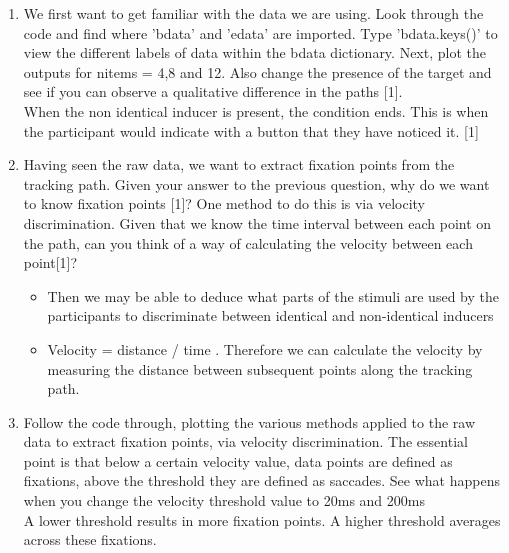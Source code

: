 \documentclass[12pt,english]{scrartcl}
\begin{document}
\begin{enumerate}
\item We first want to get familiar with the data we are using. Look through the code and find where 'bdata' and 'edata' are imported. Type 'bdata.keys()' to view the different labels of data within the bdata dictionary. Next, plot the outputs for nitems = 4,8 and 12. Also change the presence of the target and see if you can observe a qualitative difference in the paths [1]. \\

 \color{blue}
 When the non identical inducer is present, the condition ends. This is when the participant would indicate with a button that they have noticed it. [1] 
 
 \color{black}
 \item Having seen the raw data, we want to extract fixation points from the tracking path. Given your answer to the previous question, why do we want to know fixation points [1]? One method to do this is via velocity discrimination. Given that we know the time interval between each point on the path, can you think of a way of calculating the velocity between each point[1]? \\
 
 \color{blue}
 \begin{itemize}
  \item Then we may be able to deduce what parts of the stimuli are used by the participants to discriminate between identical and non-identical inducers \\
 
  \item Velocity = distance / time . Therefore we can calculate the velocity by measuring the distance between subsequent points along the tracking path. \\
 
 \end{itemize}

 \color{black}
 \item Follow the code through, plotting the various methods applied to the raw data to extract fixation points, via velocity discrimination. The essential point is that below a certain velocity value, data points are defined as fixations, above the threshold they are defined as saccades. See what happens when you change the velocity threshold value to 20ms and 200ms\\
 
 \color{blue}
 A lower threshold results in more fixation points. A higher threshold averages across these fixations. \\
 

\end{enumerate}
\end{document}
